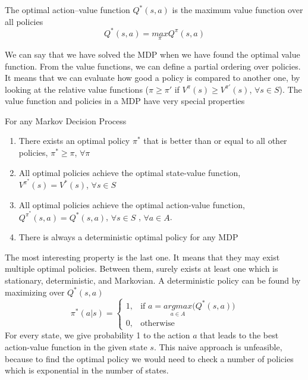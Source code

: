 \documentclass[../main.tex]{subfiles}
\begin{document}
\begin{definition}
    The optimal action–value function $Q^*(s,a)$ is the maximum value function over all policies
    \begin{equation}
        Q^*(s,a) = \underset{\pi}{max} Q^{\pi}(s,a)
    \end{equation}
\end{definition}
We can say that we have solved the MDP when we have found the optimal value function. From the value functions, we can define a partial ordering over policies. It means that we can evaluate how good a policy is compared to another one, by looking at the relative value functions ($\pi \geq \pi'$ if $V^{\pi}(s) \geq V^{\pi'}(s)$, $\forall s \in S$).
The value function and policies in a MDP have very special properties
\begin{theorem}
    For any Markov Decision Process
    \begin{enumerate}
        \item There exists an optimal policy $\pi^*$ that is better than or equal to all other policies, $\pi^* \geq \pi$, $\forall \pi$
        \item All optimal policies achieve the optimal state-value function, $V^{\pi^*}(s) = V^*(s)$, $\forall s \in S$
        \item All optimal policies achieve the optimal action-value function, $Q^{\pi^*}(s,a) = Q^*(s,a)$, $\forall s \in S$ , $\forall a \in A$.
        \item There is always a deterministic optimal policy for any MDP
    \end{enumerate}
\end{theorem}
The most interesting property is the last one. It means that they may exist multiple optimal policies. Between them, surely exists at least one which is stationary, deterministic, and Markovian. A deterministic policy can be found by maximizing over $Q^*(s,a)$
\begin{equation}
    \pi^*(a|s) =
    \begin{cases}
        1, & \text{if } a = \underset{a \in A}{argmax} \big(Q^*(s,a)\big) \\
        0, & \text{otherwise}
    \end{cases}
\end{equation}
For every state, we give probability 1 to the action $a$ that leads to the best action-value function in the given state $s$. This naive approach is unfeasible, because to find the optimal policy we would need to check a number of policies which is exponential in the number of states.
\end{document}
